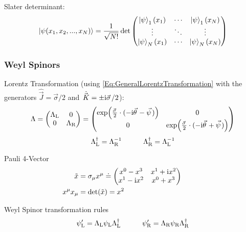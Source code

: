 			\noindent
			Slater determinant:
			\begin{equation}
				\Ket{\psi(x_1,x_2,...,x_N)} = \frac{1}{\sqrt{N!}} \det\left( \begin{matrix}
					\Ket{\psi}_1(x_1) & \dotsb & \Ket{\psi}_1(x_N) \\
					\vdots & \ddots & \vdots \\
					\Ket{\psi}_N(x_1) & \dotsb & \Ket{\psi}_N(x_N) \\
				\end{matrix} \right)
			\end{equation}

		\subsubsection{Weyl Spinors}
			\noindent
			Lorentz Transformation (using \ref{Eq:GeneralLorentzTransformation} with the generators $\hat{\vec{J}} = \vec{\sigma}/2$ and $\hat{\vec{K}} = \pm \i\vec{\sigma}/2$):
			\begin{equation}
				\Lambda 
				= \mqty(\Lambda_\text{L} & 0 \\ 0 & \Lambda_\text{R})
				= \mqty(
					\exp(\frac{\vec{\sigma}}{2}\cdot(-\i\vec{\theta} - \vec{\psi})) & 0 \\
					0 & \exp(\frac{\vec{\sigma}}{2}\cdot(-\i\vec{\theta} + \vec{\psi})) 					
						)
					\end{equation}
			\begin{equation}
				\Lambda_\text{L}^\dagger = \Lambda_\text{R}^{-1} \hspace{30pt} \Lambda_\text{R}^\dagger = \Lambda_\text{L}^{-1}
			\end{equation}

			\noindent
			Pauli 4-Vector
			\begin{equation}
				\begin{aligned}
					\tilde{x} &= \sigma_\mu x^\mu \doteq \mqty(
						x^0 - x^3 & x^1 + \i x^2 \\
						x^1 - \i x^2 & x^0 + x^3 \\
						) \hsp \\
					x^\mu x_\mu &= \det(\tilde{x}) = x^2 \\
				\end{aligned}
			\end{equation}
			
			\noindent
			Weyl Spinor transformation rules
			\begin{equation}
				\psi_\text{L}' = \Lambda_\text{L} \psi_\text{L} \Lambda_\text{L}^\dagger \hspace{30pt}
				\psi_\text{R}' = \Lambda_\text{R} \psi_\text{R} \Lambda_\text{R}^\dagger 
			\end{equation}
			

